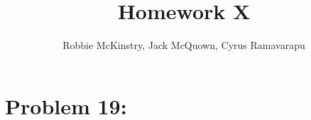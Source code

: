 \documentclass[12pt]{article}
\begin{document}
\title{Homework X}
\author{Robbie McKinstry, Jack McQuown, Cyrus Ramavarapu}
\renewcommand{\today}{27 September 2016}
\renewcommand{\baselinestretch}{1.5}
\maketitle

\section*{Problem 19: }
\end{document}
